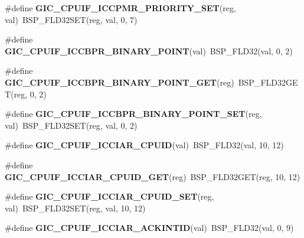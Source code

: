 \begin{DoxyCompactItemize}
\#define {\bfseries G\+I\+C\+\_\+\+C\+P\+U\+I\+F\+\_\+\+I\+C\+C\+P\+M\+R\+\_\+\+P\+R\+I\+O\+R\+I\+T\+Y\+\_\+\+S\+ET}(reg,  val)~B\+S\+P\+\_\+\+F\+L\+D32\+S\+ET(reg, val, 0, 7)
\item 
\mbox{\label{arm-gic-regs_8h_a829bb9ef91196ee3545a4aea22d0e2a3}} 
\#define {\bfseries G\+I\+C\+\_\+\+C\+P\+U\+I\+F\+\_\+\+I\+C\+C\+B\+P\+R\+\_\+\+B\+I\+N\+A\+R\+Y\+\_\+\+P\+O\+I\+NT}(val)~B\+S\+P\+\_\+\+F\+L\+D32(val, 0, 2)
\item 
\mbox{\label{arm-gic-regs_8h_a80117634fe13b99ae4f4481becb061c5}} 
\#define {\bfseries G\+I\+C\+\_\+\+C\+P\+U\+I\+F\+\_\+\+I\+C\+C\+B\+P\+R\+\_\+\+B\+I\+N\+A\+R\+Y\+\_\+\+P\+O\+I\+N\+T\+\_\+\+G\+ET}(reg)~B\+S\+P\+\_\+\+F\+L\+D32\+G\+ET(reg, 0, 2)
\item 
\mbox{\label{arm-gic-regs_8h_a05fb01248cd3af43dd6d6bc925cb09b8}} 
\#define {\bfseries G\+I\+C\+\_\+\+C\+P\+U\+I\+F\+\_\+\+I\+C\+C\+B\+P\+R\+\_\+\+B\+I\+N\+A\+R\+Y\+\_\+\+P\+O\+I\+N\+T\+\_\+\+S\+ET}(reg,  val)~B\+S\+P\+\_\+\+F\+L\+D32\+S\+ET(reg, val, 0, 2)
\item 
\mbox{\label{arm-gic-regs_8h_a8dc02f1a99ec1fb8e0ba5da9e6cc0802}} 
\#define {\bfseries G\+I\+C\+\_\+\+C\+P\+U\+I\+F\+\_\+\+I\+C\+C\+I\+A\+R\+\_\+\+C\+P\+U\+ID}(val)~B\+S\+P\+\_\+\+F\+L\+D32(val, 10, 12)
\item 
\mbox{\label{arm-gic-regs_8h_ad2969626d303cbb6363c2b0fb173ab37}} 
\#define {\bfseries G\+I\+C\+\_\+\+C\+P\+U\+I\+F\+\_\+\+I\+C\+C\+I\+A\+R\+\_\+\+C\+P\+U\+I\+D\+\_\+\+G\+ET}(reg)~B\+S\+P\+\_\+\+F\+L\+D32\+G\+ET(reg, 10, 12)
\item 
\mbox{\label{arm-gic-regs_8h_aef8d4eb95c5af09e3737145f4ac1caa5}} 
\#define {\bfseries G\+I\+C\+\_\+\+C\+P\+U\+I\+F\+\_\+\+I\+C\+C\+I\+A\+R\+\_\+\+C\+P\+U\+I\+D\+\_\+\+S\+ET}(reg,  val)~B\+S\+P\+\_\+\+F\+L\+D32\+S\+ET(reg, val, 10, 12)
\item 
\mbox{\label{arm-gic-regs_8h_a16372c6566d44c4f61747119292bc085}} 
\#define {\bfseries G\+I\+C\+\_\+\+C\+P\+U\+I\+F\+\_\+\+I\+C\+C\+I\+A\+R\+\_\+\+A\+C\+K\+I\+N\+T\+ID}(val)~B\+S\+P\+\_\+\+F\+L\+D32(val, 0, 9)
\item 
\mbox{\label{arm-gic-regs_8h_a97971c6b26f6668baf4321a27d72966a}} 

\end{DoxyCompactItemize}
